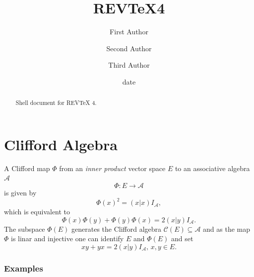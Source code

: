 \documentclass[aps,preprint]{revtex4}%
\begin{document}
\title[Short title for running header]{REV\TeX4}
\author{First Author}
\author{Second Author}
\author{Third Author}

\begin{abstract}
Shell document for REV\TeX{} 4.

\end{abstract}
\date[Date text]{date}




\maketitle
\tableofcontents


\section{Clifford Algebra}

A Clifford map $\Phi$ from an \emph{inner product} vector space $E$ to an
associative algebra $\mathcal{A}$
\begin{equation}
\Phi:E\rightarrow\mathcal{A}%
\end{equation}
is given by
\begin{equation}
\Phi\left(  x\right)  ^{2}=\left(  \left.  x\right\vert x\right)
I_{\mathcal{A}},
\end{equation}
which is equivalent to
\begin{equation}
\Phi\left(  x\right)  \Phi\left(  y\right)  +\Phi\left(  y\right)  \Phi\left(
x\right)  =2\left(  \left.  x\right\vert y\right)  I_{\mathcal{A}}.
\end{equation}
The subspace $\Phi\left(  E\right)  $ generates the Clifford algebra
$\mathcal{C}\left(  E\right)  \subseteq\mathcal{A}$ and as the map $\Phi$ is
linar and injective one can identify $E$ and $\Phi\left(  E\right)  $ and set
\begin{equation}
xy+yx=2\left(  \left.  x\right\vert y\right)  I_{\mathcal{A}},\,x,y\in E.
\end{equation}


\subsubsection{Examples}
\end{document}
